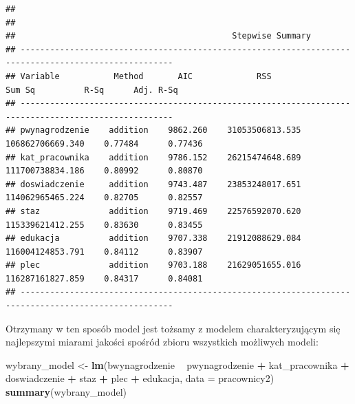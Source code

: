 \documentclass[]{book}
\newenvironment{Shaded}{\begin{snugshade}}{\end{snugshade}}
\newcommand{\DataTypeTok}[1]{\textcolor[rgb]{0.13,0.29,0.53}{#1}}
\newcommand{\KeywordTok}[1]{\textcolor[rgb]{0.13,0.29,0.53}{\textbf{#1}}}
\newcommand{\NormalTok}[1]{#1}
\newcommand{\OperatorTok}[1]{\textcolor[rgb]{0.81,0.36,0.00}{\textbf{#1}}}
\newcommand{\StringTok}[1]{\textcolor[rgb]{0.31,0.60,0.02}{#1}}
\begin{document}
\begin{verbatim}
## 
## 
##                                            Stepwise Summary                                            
## -----------------------------------------------------------------------------------------------------
## Variable           Method       AIC             RSS               Sum Sq          R-Sq      Adj. R-Sq 
## -----------------------------------------------------------------------------------------------------
## pwynagrodzenie    addition    9862.260    31053506813.535    106862706669.340    0.77484      0.77436 
## kat_pracownika    addition    9786.152    26215474648.689    111700738834.186    0.80992      0.80870 
## doswiadczenie     addition    9743.487    23853248017.651    114062965465.224    0.82705      0.82557 
## staz              addition    9719.469    22576592070.620    115339621412.255    0.83630      0.83455 
## edukacja          addition    9707.338    21912088629.084    116004124853.791    0.84112      0.83907 
## plec              addition    9703.188    21629051655.016    116287161827.859    0.84317      0.84081 
## -----------------------------------------------------------------------------------------------------
\end{verbatim}

Otrzymany w ten sposób model jest tożsamy z modelem charakteryzującym się najlepszymi miarami jakości spośród zbioru wszystkich możliwych modeli:

\begin{Shaded}
\begin{Highlighting}[]
\NormalTok{wybrany_model <-}\StringTok{ }\KeywordTok{lm}\NormalTok{(bwynagrodzenie }\OperatorTok{~}\StringTok{ }\NormalTok{pwynagrodzenie }\OperatorTok{+}\StringTok{ }\NormalTok{kat_pracownika }\OperatorTok{+}\StringTok{ }\NormalTok{doswiadczenie }\OperatorTok{+}\StringTok{ }\NormalTok{staz }\OperatorTok{+}\StringTok{ }\NormalTok{plec }\OperatorTok{+}\StringTok{ }\NormalTok{edukacja, }\DataTypeTok{data =}\NormalTok{ pracownicy2)}
\KeywordTok{summary}\NormalTok{(wybrany_model)}
\end{Highlighting}
\end{Shaded}
\end{document}
